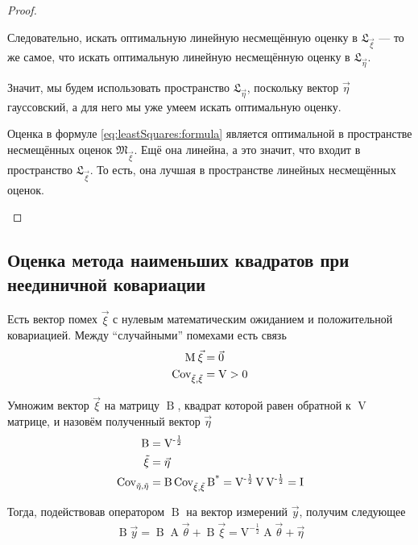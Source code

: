 \begin{proof}
\begin{enumerate}
            Следовательно, искать оптимальную линейную несмещённую оценку в
            $\mathfrak{L}_{\vec{\xi}}$ --- то же самое, что искать оптимальную
            линейную несмещённую оценку в $\mathfrak{L}_{\vec{\eta}}$.

            Значит, мы будем использовать пространство
            $\mathfrak{L}_{\vec{\eta}}$, поскольку вектор $\vec{\eta}$
            гауссовский, а для него мы уже умеем искать оптимальную оценку.

            Оценка в формуле \eqref{eq:leastSquares:formula} является
            оптимальной в пространстве несмещённых оценок
            $\mathfrak{M}_{\vec{\xi}}$. Ещё она линейна, а это значит, что
            входит в пространство $\mathfrak{L}_{\vec{\xi}}$.
            То есть, она лучшая в пространстве линейных несмещённых оценок.
    \end{enumerate}
\end{proof}
\subsection{Оценка метода наименьших квадратов при неединичной ковариации}

Есть вектор помех $\vec{\xi}$ с нулевым математическим ожиданием и положительной
ковариацией. Между ``случайными'' помехами есть связь
\begin{align*}
    \operatorname{M}_{} \vec{\xi} &= \vec{0} \\
    \operatorname{Cov^{}_{\vec{\xi}, \vec{\xi}}} &= \operatorname{V} > 0
\end{align*}

Умножим вектор $\vec{\xi}$ на матрицу $\operatorname{B}$, квадрат которой равен
обратной к $\operatorname{V}$ матрице, и назовём полученный вектор $\vec{\eta}$
\begin{align*}
    \operatorname{B} &= \operatorname{V^{-\frac{1}{2}}} \\
    \operatorname{\vec{\xi}} &= \vec{\eta} \\
    \operatorname{Cov^{}_{\vec{\eta}, \vec{\eta}}} &= \operatorname{B} \operatorname{Cov^{}_{\vec{\xi}, \vec{\xi}}} \operatorname{B^*}
        = \operatorname{V^{-\frac{1}{2}}} \operatorname{V}
            \operatorname{V^{-\frac{1}{2}}} = \operatorname{I}
\end{align*}

Тогда, подействовав оператором $\operatorname{B}$ на вектор измерений $\vec{y}$,
получим следующее
\begin{align*}
    \operatorname{B} \vec{y}
    = \operatorname{B} \operatorname{A} \vec{\theta}
        + \operatorname{B} \vec{\xi}
    = \operatorname{V^{-\frac{1}{2}}} \operatorname{A} \vec{\theta} + \vec{\eta}
\end{align*}

